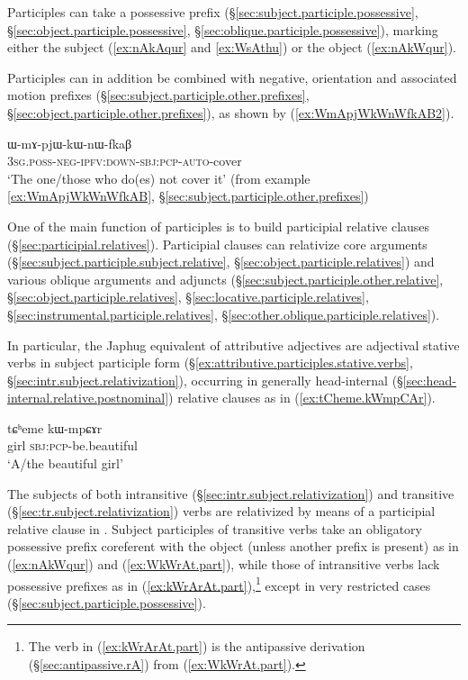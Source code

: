 Participles can take a possessive prefix (§\ref{sec:subject.participle.possessive}, §\ref{sec:object.participle.possessive}, §\ref{sec:oblique.participle.possessive}), marking either the subject (\ref{ex:nAkAqur} and \ref{ex:WsAthu}) or the object (\ref{ex:nAkWqur}).  

Participles can in addition be combined with negative, orientation and associated motion prefixes (§\ref{sec:subject.participle.other.prefixes}, §\ref{sec:object.participle.other.prefixes}), as shown by (\ref{ex:WmApjWkWnWfkAB2}).

\begin{exe}
\ex \label{ex:WmApjWkWnWfkAB2}
\gll ɯ-mɤ-pjɯ-kɯ-nɯ-fkaβ \\
\textsc{3sg}.\textsc{poss}-\textsc{neg}-\textsc{ipfv}:\textsc{down}-\textsc{sbj}:\textsc{pcp}-\textsc{auto}-cover \\
\glt `The one/those who do(es) not cover it' (from example \ref{ex:WmApjWkWnWfkAB}, §\ref{sec:subject.participle.other.prefixes}) 
\end{exe}

One of the main function of participles is to build participial relative clauses (§\ref{sec:participial.relatives}). Participial clauses can relativize core arguments (§\ref{sec:subject.participle.subject.relative}, §\ref{sec:object.participle.relatives}) and various oblique arguments and adjuncts (§\ref{sec:subject.participle.other.relative}, §\ref{sec:object.participle.relatives}, §\ref{sec:locative.participle.relatives}, §\ref{sec:instrumental.participle.relatives}, §\ref{sec:other.oblique.participle.relatives}).

In particular, the Japhug equivalent of attributive adjectives are adjectival stative verbs in subject participle form (§\ref{ex:attributive.participles.stative.verbs}, §\ref{sec:intr.subject.relativization}), occurring in generally head-internal (§\ref{sec:head-internal.relative.postnominal}) relative clauses as in (\ref{ex:tCheme.kWmpCAr}).

\begin{exe}
\ex \label{ex:tCheme.kWmpCAr}
\gll tɕʰeme kɯ-mpɕɤr \\
girl \textsc{sbj}:\textsc{pcp}-be.beautiful \\
\glt `A/the beautiful girl' 
\end{exe}

The subjects of both intransitive (§\ref{sec:intr.subject.relativization}) and transitive (§\ref{sec:tr.subject.relativization}) verbs are relativized by means of a participial relative clause in . Subject participles of transitive verbs take an obligatory possessive prefix coreferent with the object (unless another prefix is present) as in (\ref{ex:nAkWqur}) and (\ref{ex:WkWrAt.part}), while those of intransitive verbs lack possessive prefixes as in (\ref{ex:kWrArAt.part}),\footnote{The verb  in (\ref{ex:kWrArAt.part}) is the antipassive derivation (§\ref{sec:antipassive.rA}) from  (\ref{ex:WkWrAt.part}). } except in very restricted cases (§\ref{sec:subject.participle.possessive}).

